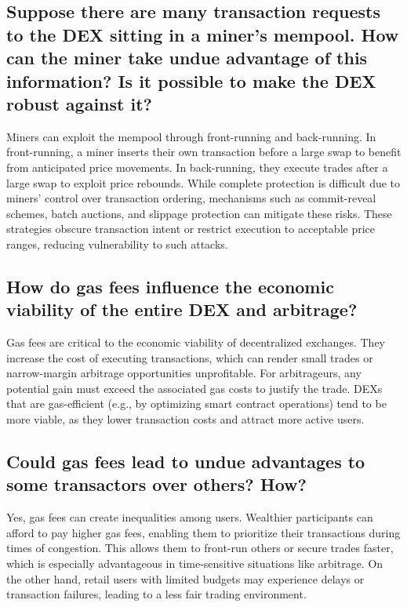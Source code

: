 \documentclass[12pt,a4paper]{article}
\begin{document}
\subsection*{Suppose there are many transaction requests to the DEX sitting in a miner's mempool. How can the miner take undue advantage of this information? Is it possible to make the DEX robust against it?}

Miners can exploit the mempool through front-running and back-running. In front-running, a miner inserts their own transaction before a large swap to benefit from anticipated price movements. In back-running, they execute trades after a large swap to exploit price rebounds. While complete protection is difficult due to miners' control over transaction ordering, mechanisms such as commit-reveal schemes, batch auctions, and slippage protection can mitigate these risks. These strategies obscure transaction intent or restrict execution to acceptable price ranges, reducing vulnerability to such attacks.

\subsection*{How do gas fees influence the economic viability of the entire DEX and arbitrage?}

Gas fees are critical to the economic viability of decentralized exchanges. They increase the cost of executing transactions, which can render small trades or narrow-margin arbitrage opportunities unprofitable. For arbitrageurs, any potential gain must exceed the associated gas costs to justify the trade. DEXs that are gas-efficient (e.g., by optimizing smart contract operations) tend to be more viable, as they lower transaction costs and attract more active users.

\subsection*{Could gas fees lead to undue advantages to some transactors over others? How?}

Yes, gas fees can create inequalities among users. Wealthier participants can afford to pay higher gas fees, enabling them to prioritize their transactions during times of congestion. This allows them to front-run others or secure trades faster, which is especially advantageous in time-sensitive situations like arbitrage. On the other hand, retail users with limited budgets may experience delays or transaction failures, leading to a less fair trading environment.
\end{document}
